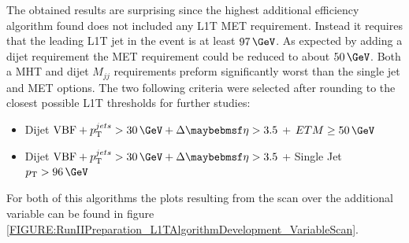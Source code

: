 The obtained results are surprising since the highest additional efficiency algorithm found does not included any \gls{L1T} \gls{MET} requirement. Instead it requires that the leading \gls{L1T} jet in the event is at least $97\,\GeV$. As expected by adding a dijet requirement  the \gls{MET} requirement could be reduced to about $50\,\GeV$. Both a \gls{MHT} and dijet $M_{jj}$ requirements preform significantly worst than the single jet and \gls{MET} options. The two following criteria were selected after rounding to the closest possible \gls{L1T} thresholds for further studies:


\begin{itemize}
  \item Dijet $\text{VBF} + \pt^{jets}>30\,\GeV + \Delta\eta>3.5$ + $ETM \geq 50\,\GeV$
  \item Dijet $\text{VBF} + \pt^{jets}>30\,\GeV + \Delta\eta>3.5$ + Single Jet $\pt>96\,\GeV$ 
\end{itemize}

For both of this algorithms the plots resulting from the scan over the additional variable can be found in figure \ref{FIGURE:RunIIPreparation_L1TAlgorithmDevelopment_VariableScan}. 

